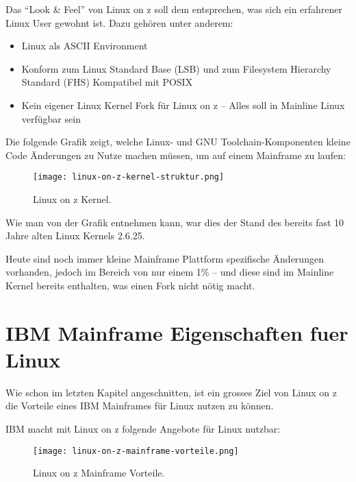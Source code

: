 Das “Look \& Feel” von Linux on z soll dem entsprechen, was sich ein erfahrener Linux User gewohnt ist. Dazu gehören unter anderem:

\begin{itemize}
    \item{Linux als ASCII Environment}
    \item{Konform zum Linux Standard Base (LSB) und zum Filesystem Hierarchy Standard (FHS) Kompatibel mit POSIX}
    \item{Kein eigener Linux Kernel Fork für Linux on z -- Alles soll in Mainline Linux verfügbar sein}
\end{itemize}

Die folgende Grafik zeigt, welche Linux- und GNU Toolchain-Komponenten kleine Code Änderungen zu Nutze machen müssen, um auf einem Mainframe zu laufen:

\begin{figure}[h!]
\centering
\texttt{[image: linux-on-z-kernel-struktur.png]}
\caption{Linux on z Kernel\cite{LinuxOnZKernel}.}
\label{fig:LinuxOnZKernel}
\end{figure}

Wie man von der Grafik entnehmen kann, war dies der Stand des bereits fast 10 Jahre alten Linux Kernels 2.6.25.

Heute sind noch immer kleine Mainframe Plattform spezifische Änderungen vorhanden, jedoch im Bereich von nur einem 1\%\cite{LinuxOnZSpecCode} -- und diese sind im Mainline Kernel bereits enthalten, was einen Fork nicht nötig macht.

\section{IBM Mainframe Eigenschaften fuer Linux}

Wie schon im letzten Kapitel angeschnitten, ist ein grosses Ziel von Linux on z die Vorteile eines IBM Mainframes für Linux nutzen zu können.

IBM macht mit Linux on z folgende Angebote für Linux nutzbar:

\begin{figure}[h!]
\centering
\texttt{[image: linux-on-z-mainframe-vorteile.png]}
\caption{Linux on z Mainframe Vorteile\cite{LinuxOnZMainframeVorteile}.}
\label{fig:LinuxOnZMainframeVorteile}
\end{figure}

\newpage

